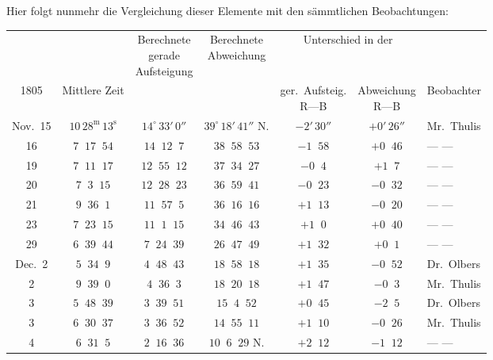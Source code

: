 \par\indent Hier folgt nunmehr die Vergleichung dieser Elemente mit den sämmtlichen Beobachtungen:



\begin{center}\begingroup
\fontsize{8}{10}\selectfont
\setlength{\tabcolsep}{2pt}\renewcommand{\arraystretch}{1.12}
\begin{tabular}{|c|c|c|c|c|c|l|}
\hline
& & \shortstack{Berechnete\\gerade\\Aufsteigung} & \shortstack{Berechnete\\Abweichung} & \multicolumn{2}{c|}{Unterschied in der} & \\
1805 & Mittlere Zeit & & & \shortstack{ger.\ Aufsteig.\\R---B} & \shortstack{Abweichung\\R---B} & Beobachter \\
\hline
Nov.\ 15 & $10\,28^{\mathrm{m}}\,13^{\mathrm{s}}$ & $14^{\circ}\,33'\,0''$ & $39^{\circ}\,18'\,41''$ N. & $-2'\,30''$ & $+0'\,26''$ & Mr.\ Thulis \\
16 & $7\;\;17\;\;54$ & $14\;\;12\;\;7$ & $38\;\;58\;\;53$ & $-1\;\;58$ & $+0\;\;46$ & --- --- \\
19 & $7\;\;11\;\;17$ & $12\;\;55\;\;12$ & $37\;\;34\;\;27$ & $-0\;\;4$ & $+1\;\;7$ & --- --- \\
20 & $7\;\;3\;\;15$ & $12\;\;28\;\;23$ & $36\;\;59\;\;41$ & $-0\;\;23$ & $-0\;\;32$ & --- --- \\
21 & $9\;\;36\;\;1$ & $11\;\;57\;\;5$ & $36\;\;16\;\;16$ & $+1\;\;13$ & $-0\;\;20$ & --- --- \\
23 & $7\;\;23\;\;15$ & $11\;\;1\;\;15$ & $34\;\;46\;\;43$ & $+1\;\;0$ & $+0\;\;40$ & --- --- \\
29 & $6\;\;39\;\;44$ & $7\;\;24\;\;39$ & $26\;\;47\;\;49$ & $+1\;\;32$ & $+0\;\;1$ & --- --- \\
Dec.\ 2 & $5\;\;34\;\;9$ & $4\;\;48\;\;43$ & $18\;\;58\;\;18$ & $+1\;\;35$ & $-0\;\;52$ & Dr.\ Olbers \\
2 & $9\;\;39\;\;0$ & $4\;\;36\;\;3$ & $18\;\;20\;\;18$ & $+1\;\;47$ & $-0\;\;3$ & Mr.\ Thulis \\
3 & $5\;\;48\;\;39$ & $3\;\;39\;\;51$ & $15\;\;4\;\;52$ & $+0\;\;45$ & $-2\;\;5$ & Dr.\ Olbers \\
3 & $6\;\;30\;\;37$ & $3\;\;36\;\;52$ & $14\;\;55\;\;11$ & $+1\;\;10$ & $-0\;\;26$ & Mr.\ Thulis \\
4 & $6\;\;31\;\;5$ & $2\;\;16\;\;36$ & $10\;\;6\;\;29$ N. & $+2\;\;12$ & $-1\;\;12$ & --- --- \\

\end{tabular}
\end{center}
